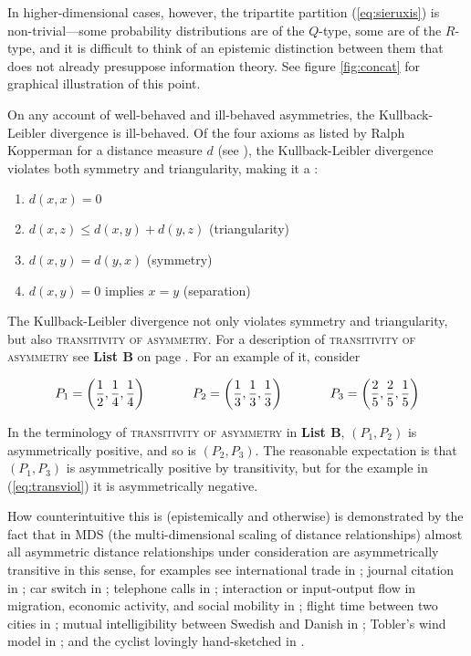 \documentclass[11pt]{article}
\begin{document}
In higher-dimensional cases, however, the tripartite partition
(\ref{eq:sieruxis}) is non-trivial---some probability distributions
are of the $Q$-type, some are of the $R$-type, and it is difficult to
think of an epistemic distinction between them that does not already
presuppose information theory. See figure \ref{fig:concat} for
graphical illustration of this point.

On any account of well-behaved and ill-behaved asymmetries, the
Kullback-Leibler divergence is ill-behaved. Of the four axioms as
listed by Ralph Kopperman for a distance measure $d$ (see
), the Kullback-Leibler divergence violates
both symmetry and triangularity, making it a :

\begin{enumerate}[(m1)]
\item $d(x,x)=0$
\item $d(x,z)\leq{}d(x,y)+d(y,z)$ (triangularity)
\item $d(x,y)=d(y,x)$ (symmetry)
\item $d(x,y)=0$ implies $x=y$ (separation)
\end{enumerate}

The Kullback-Leibler divergence not only violates symmetry and
triangularity, but also \textsc{transitivity of asymmetry}. For a
description of \textsc{transitivity of asymmetry} see \textbf{List B} on page
\pageref{page:listtwo}. For an example of it, consider

\begin{equation}
  \label{eq:transviol}
    P_{1}=\left(\frac{1}{2},\frac{1}{4},\frac{1}{4}\right)  \hspace{.5in}
    P_{2}=\left(\frac{1}{3},\frac{1}{3},\frac{1}{3}\right) \hspace{.5in}
    P_{3}=\left(\frac{2}{5},\frac{2}{5},\frac{1}{5}\right)
\end{equation}

In the terminology of \textsc{transitivity of asymmetry} in \textbf{List B},
$(P_{1},P_{2})$ is asymmetrically positive, and so is $(P_{2},P_{3})$.
The reasonable expectation is that $(P_{1},P_{3})$ is asymmetrically
positive by transitivity, but for the example in (\ref{eq:transviol})
it is asymmetrically negative.

How counterintuitive this is (epistemically and otherwise) is
demonstrated by the fact that in MDS (the multi-dimensional scaling of
distance relationships) almost all asymmetric distance relationships
under consideration are asymmetrically transitive in this sense, for
examples see international trade in ; journal
citation in ; car switch in
; telephone calls in
; interaction or input-output flow in
migration, economic activity, and social mobility in
; flight time between two cities in
; mutual intelligibility between Swedish
and Danish in ; Tobler's wind model in
; and the cyclist lovingly hand-sketched in
.
\end{document}

